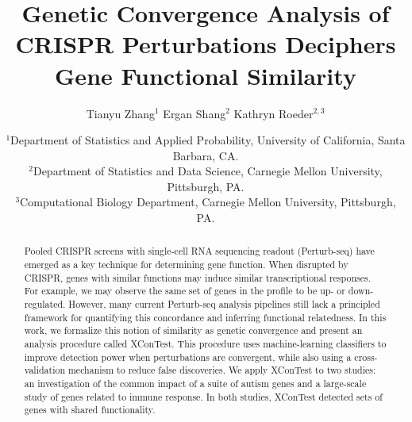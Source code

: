 \documentclass[11pt]{article}
\begin{document}
\title{
Genetic Convergence Analysis of CRISPR Perturbations Deciphers Gene Functional Similarity
}

\author{
  Tianyu Zhang$^{1}$ \quad
  Ergan Shang$^{2}$ \quad
  Kathryn Roeder$^{2,3}$
}

\date{
  {\small
  $^{1}$Department of Statistics and Applied Probability, University of California, Santa Barbara, CA.\\
  $^{2}$Department of Statistics and Data Science, Carnegie Mellon University, Pittsburgh, PA.\\
  $^{3}$Computational Biology Department, Carnegie Mellon University, Pittsburgh, PA.
  }
}

\maketitle

\begin{abstract}
Pooled CRISPR screens with single-cell RNA sequencing readout (Perturb-seq) have emerged as a key technique for determining gene function. When disrupted by CRISPR, genes with similar functions may induce similar transcriptional responses. For example, we may observe the same set of genes in the profile to be up- or down-regulated. However, many current Perturb-seq analysis pipelines still lack a principled framework for quantifying this concordance and inferring functional relatedness. In this work, we formalize this notion of similarity as genetic convergence and present an analysis procedure called XConTest. This procedure uses machine-learning classifiers to improve detection power when perturbations are convergent, while also using a cross-validation mechanism to reduce false discoveries. We apply XConTest to two studies: an investigation of the common impact of a suite of autism genes and a large-scale study of genes related to immune response. In both studies, XConTest detected sets of genes with shared functionality.
\end{abstract}


\newpage
\end{document}
